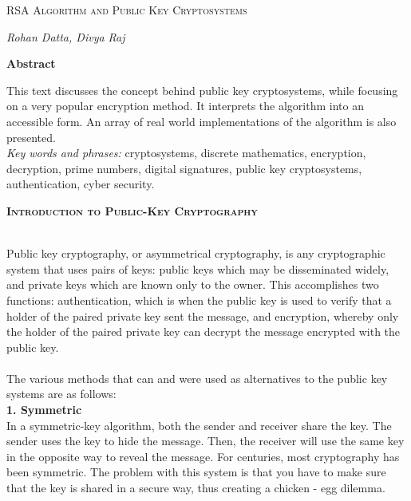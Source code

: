 \documentclass[12 pt]{article}
\begin{document}
\begin{titlepage}
\begin{Huge}
\begin{center}
\textsc{ RSA Algorithm \linebreak
and \linebreak
Public Key Cryptosystems}
\end{center}
\end{Huge}
\begin{center}
\begin{large}
\textsl{ Rohan Datta, Divya Raj}
\end{large}
\end{center}

\bigskip 
\begin{center}
\textbf{Abstract}
\end{center}
This text discusses the concept behind public key cryptosystems, while focusing on a very popular encryption method. It interprets the algorithm into an accessible form. An array of real world implementations of the algorithm is also presented.\\[22 pt]
\noindent \textit{Key words and phrases:} cryptosystems, discrete mathematics, encryption, decryption, prime numbers, digital signatures, public key cryptosystems, authentication, cyber security.

\end{titlepage}
\pagebreak
\begin{LARGE}	
\begin{center}
\textbf{\textsc{Introduction to Public-Key Cryptography}}
\end{center}
\end{LARGE}

\noindent 
\\Public key cryptography, or asymmetrical cryptography, is any cryptographic system that uses pairs of keys: public keys which may be disseminated widely, and private keys which are known only to the owner. This accomplishes two functions: authentication, which is when the public key is used to verify that a holder of the paired private key sent the message, and encryption, whereby only the holder of the paired private key can decrypt the message encrypted with the public key.
\\\\The various methods that can and were used as alternatives to the public key systems are as follows:
\\\textbf{1. Symmetric}\\In a symmetric-key algorithm, both the sender and receiver share the key. The sender uses the key to hide the message. Then, the receiver will use the same key in the opposite way to reveal the message. For centuries, most cryptography has been symmetric. The problem with this system is that you have to make sure that the key is shared in a secure way, thus creating a chicken - egg dilemma.
\end{document}
